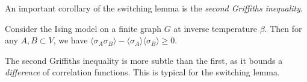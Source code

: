 


An important corollary of the switching lemma is the \emph{second Griffiths inequality}.

\begin{lemma}
    Consider the Ising model on a finite graph $G$ at inverse temperature $\beta$.
    Then for any $A,B\subset V$, we have
    $\langle\sigma_{A}\sigma_B\rangle-\langle\sigma_A\rangle\langle\sigma_B\rangle\geq 0$.
\end{lemma}

The second Griffiths inequality is more subtle than the first,
as it bounds a \emph{difference} of correlation functions.
This is typical for the switching lemma.

